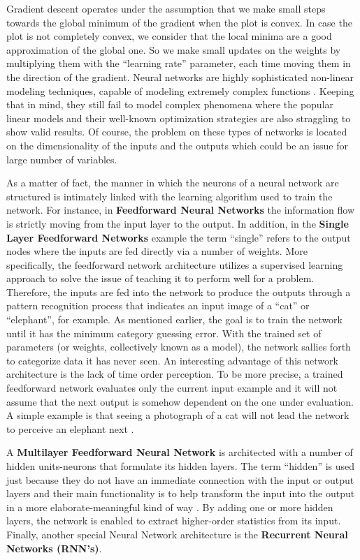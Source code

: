 Gradient descent operates under the assumption that we make small steps towards the global minimum of the gradient when the plot is convex. In case the plot is not completely convex, we consider that the local minima are a good approximation of the global one. So we make small updates on the weights by multiplying them with the “learning rate” parameter, each time moving them in the direction of the gradient. Neural networks are highly sophisticated non-linear modeling techniques, capable of modeling extremely complex functions \cite{dilhani2017effect}. Keeping that in mind, they still fail to model complex phenomena where the popular linear models and their well-known optimization strategies are also straggling to show valid results. Of course, the problem on these types of networks is located on the dimensionality of the inputs and the outputs which could be an issue for large number of variables.
\par As a matter of fact, the manner in which the neurons of a neural network are structured is intimately linked with the learning algorithm used to train the network. For instance, in \textbf{Feedforward Neural Networks} the information flow is strictly moving from the input layer to the output. In addition, in the \textbf{Single Layer Feedforward Networks} example the term “single” refers to the output nodes where the inputs are fed directly via a number of weights.
More specifically, the feedforward network architecture utilizes a supervised learning approach to solve the issue of teaching it to perform well for a problem. Therefore, the inputs are fed into the network to produce the outputs through a pattern recognition process that indicates an input image of a “cat” or “elephant”, for example. As mentioned earlier, the goal is to train the network until it has the minimum category guessing error. With the trained set of parameters (or weights, collectively known as a model), the network sallies forth to categorize data it has never seen. An interesting advantage of this network architecture is the lack of time order perception. To be more precise, a trained feedforward network evaluates only the current input example and it will not assume that the next output is somehow dependent on the one under evaluation. A simple example is that seeing a photograph of a cat will not lead the network to perceive an elephant next \cite{grus2019data}.
\par A \textbf{Multilayer Feedforward Neural Network} is architected with a number of hidden units-neurons that formulate its hidden layers. The term “hidden” is used just because they do not have an immediate connection with the input or output layers and their main functionality is to help transform the input into the output in a more elaborate-meaningful kind of way \cite{gupta2018fundamentals}. By adding one or more hidden layers, the network is enabled to extract higher-order statistics from its input. Finally, another special Neural Network architecture is the \textbf{Recurrent Neural Networks (RNN's)}.
